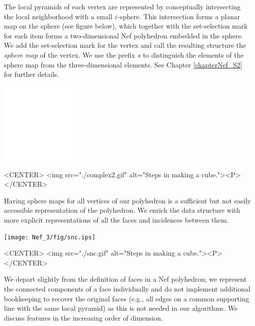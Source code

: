 The local pyramids of each vertex are represented by
conceptually intersecting the local neighborhood with a small
$\varepsilon$-sphere. This intersection forms a planar map on the
sphere (see figure below), which together with the set-selection
mark for each item forms a two-dimensional Nef polyhedron embedded in
the sphere. We add the set-selection mark for the vertex and call the
resulting structure the \emph{sphere map} of the vertex.  
We use the prefix $s$ to distinguish the elements of the sphere map
from the three-dimensional elements. See Chapter \ref{chapterNef_S2} 
for further details.

\begin{ccTexOnly}
    \begin{center}
      \parbox{0.3\textwidth}{%
          \includegraphics[width=0.3\textwidth]{Nef_3/fig/complex2}%
      }
    \end{center}
\end{ccTexOnly}

\begin{ccHtmlOnly}
    <CENTER>
        <img src="./complex2.gif" alt="Steps in making a cube."><P>
    </CENTER>
\end{ccHtmlOnly}

Having sphere maps for all vertices of our polyhedron is a sufficient
but not easily accessible representation of the polyhedron. We enrich
the data structure with more explicit representations of all the faces
and incidences between them. 

\begin{ccTexOnly}
    \begin{center}
      \parbox{0.6\textwidth}{%
          \texttt{[image: Nef\_3/fig/snc.ips]}%
      }
    \end{center}
\end{ccTexOnly}

\begin{ccHtmlOnly}
    <CENTER>
        <img src="./snc.gif" alt="Steps in making a cube."><P>
    </CENTER>
\end{ccHtmlOnly}

We depart slightly from the
definition of faces in a Nef polyhedron; we represent the connected
components of a face individually and do not implement additional
bookkeeping to recover the original faces (e.g., all edges on a common
supporting line with the same local pyramid) as this is not needed in
our algorithms.  We discuss features in the increasing order of 
dimension.

